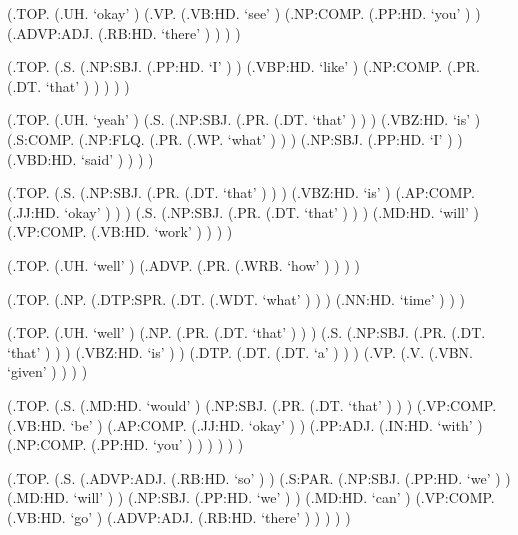 \documentclass[10pt]{article}
\begin{document}
\begin{parsetree}  (.TOP. (.UH. `okay' ) (.VP. (.VB:HD. `see' ) (.NP:COMP. (.PP:HD. `you' ) ) (.ADVP:ADJ. (.RB:HD. `there' ) ) ) ) \end{parsetree}

\begin{parsetree}  (.TOP. (.S. (.NP:SBJ. (.PP:HD. `I' ) ) (.VBP:HD. `like' ) (.NP:COMP. (.PR. (.DT. `that' ) ) ) ) ) \end{parsetree}

\begin{parsetree}  (.TOP. (.UH. `yeah' ) (.S. (.NP:SBJ. (.PR. (.DT. `that' ) ) ) (.VBZ:HD. `is' ) (.S:COMP. (.NP:FLQ. (.PR. (.WP. `what' ) ) ) (.NP:SBJ. (.PP:HD. `I' ) ) (.VBD:HD. `said' ) ) ) ) \end{parsetree}

\begin{parsetree}  (.TOP. (.S. (.NP:SBJ. (.PR. (.DT. `that' ) ) ) (.VBZ:HD. `is' ) (.AP:COMP. (.JJ:HD. `okay' ) ) ) (.S. (.NP:SBJ. (.PR. (.DT. `that' ) ) ) (.MD:HD. `will' ) (.VP:COMP. (.VB:HD. `work' ) ) ) ) \end{parsetree}

\begin{parsetree}  (.TOP. (.UH. `well' ) (.ADVP. (.PR. (.WRB. `how' ) ) ) ) \end{parsetree}

\begin{parsetree}  (.TOP. (.NP. (.DTP:SPR. (.DT. (.WDT. `what' ) ) ) (.NN:HD. `time' ) ) ) \end{parsetree}

\begin{parsetree}  (.TOP. (.UH. `well' ) (.NP. (.PR. (.DT. `that' ) ) ) (.S. (.NP:SBJ. (.PR. (.DT. `that' ) ) ) (.VBZ:HD. `is' ) ) (.DTP. (.DT. (.DT. `a' ) ) ) (.VP. (.V. (.VBN. `given' ) ) ) ) \end{parsetree}

\begin{parsetree}  (.TOP. (.S. (.MD:HD. `would' ) (.NP:SBJ. (.PR. (.DT. `that' ) ) ) (.VP:COMP. (.VB:HD. `be' ) (.AP:COMP. (.JJ:HD. `okay' ) ) (.PP:ADJ. (.IN:HD. `with' ) (.NP:COMP. (.PP:HD. `you' ) ) ) ) ) ) \end{parsetree}

\begin{parsetree}  (.TOP. (.S. (.ADVP:ADJ. (.RB:HD. `so' ) ) (.S:PAR. (.NP:SBJ. (.PP:HD. `we' ) ) (.MD:HD. `will' ) ) (.NP:SBJ. (.PP:HD. `we' ) ) (.MD:HD. `can' ) (.VP:COMP. (.VB:HD. `go' ) (.ADVP:ADJ. (.RB:HD. `there' ) ) ) ) ) \end{parsetree}
\end{document}
